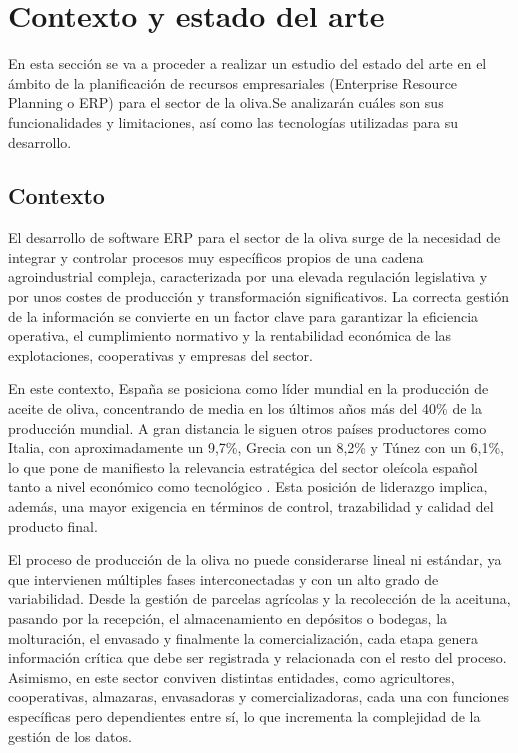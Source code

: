 \chapter{Contexto y estado del arte}\label{cap:estado}

En esta sección se va a proceder a realizar un estudio del estado del arte en el ámbito de la planificación de 
recursos empresariales (Enterprise Resource Planning o ERP) para el sector de la oliva.Se analizarán cuáles 
son sus funcionalidades y limitaciones, así como las tecnologías utilizadas para su desarrollo.

\section{Contexto}

El desarrollo de software ERP para el sector de la oliva surge de la necesidad de integrar y controlar procesos 
muy específicos propios de una cadena agroindustrial compleja, caracterizada por una elevada regulación legislativa 
y por unos costes de producción y transformación significativos. La correcta gestión de la información se convierte 
en un factor clave para garantizar la eficiencia operativa, el cumplimiento normativo y la rentabilidad económica de 
las explotaciones, cooperativas y empresas del sector.

En este contexto, España se posiciona como líder mundial en la producción de aceite de oliva, concentrando de media en 
los últimos años más del 40\% de la producción mundial. A gran distancia le siguen otros países productores como Italia, 
con aproximadamente un 9,7\%, Grecia con un 8,2\% y Túnez con un 6,1\%, lo que pone de manifiesto la relevancia 
estratégica del sector oleícola español tanto a nivel económico como tecnológico \cite{principalesProductoresAceiteOliva}.
Esta posición de liderazgo implica, además, una mayor exigencia en términos de control, trazabilidad y calidad del 
producto final.

El proceso de producción de la oliva no puede considerarse lineal ni estándar, ya que intervienen múltiples fases 
interconectadas y con un alto grado de variabilidad. Desde la gestión de parcelas agrícolas y la recolección de la 
aceituna, pasando por la recepción, el almacenamiento en depósitos o bodegas, la molturación, el envasado y finalmente 
la comercialización, cada etapa genera información crítica que debe ser registrada y relacionada con el resto del 
proceso. Asimismo, en este sector conviven distintas entidades, como agricultores, cooperativas, almazaras, envasadoras
y comercializadoras, cada una con funciones específicas pero dependientes entre sí, lo que incrementa la complejidad de 
la gestión de los datos.

